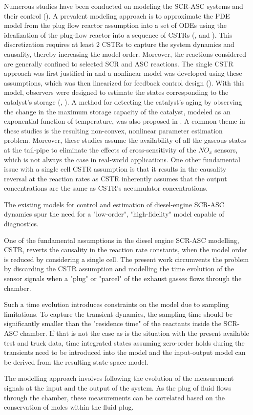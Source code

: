 Numerous studies have been conducted on modeling the SCR-ASC systems and their control (\cite{yuan2015diesel}). A
prevalent modeling approach is to approximate the PDE model from the plug flow reactor assumption into a set of ODEs
using the idealization of the plug-flow reactor into a sequence of CSTRs (\cite{hsieh2011development}, and
\cite{nova2014urea}). This discretization requires at least 2 CSTRs to capture the system dynamics and causality,
thereby increasing the model order. Moreover, the reactions considered are generally confined to selected SCR and ASC
reactions. The single CSTR approach was first justified in \cite{devarakonda2008adequacy} and a nonlinear model was
developed using these assumptions, which was then linearized for feedback control design (\cite{devarakonda2009model}).
With this model, observers were designed to estimate the states corresponding to the catalyst's storage
(\cite{ma2017observer}, \cite{jain2020term}). A method for detecting the catalyst's aging by observing the change in the
maximum storage capacity of the catalyst, modeled as an exponential function of temperature, was also proposed in
\cite{ma2017observer}. A common theme in these studies is the resulting non-convex, nonlinear parameter estimation
problem. Moreover, these studies assume the availability of all the gaseous states at the tail-pipe to eliminate the
effects of cross-sensitivity of the $NO_x$ sensors, which is not always the case in real-world applications. One other
fundamental issue with a single cell CSTR assumption is that it results in the causality reversal at the reaction rates
as CSTR inherently assumes that the output concentrations are the same as CSTR's accumulator concentrations.


The existing models for control and estimation of diesel-engine SCR-ASC dynamics spur the need for a "low-order",
"high-fidelity" model capable of diagnostics.

One of the fundamental assumptions in the diesel engine SCR-ASC modelling, CSTR, reverts the causality in the reaction
rate constants, when the model order is reduced by considering a single cell. The present work circumvents the problem
by discarding the CSTR assumption and modelling the time evolution of the sensor signals when a "plug" or "parcel" of
the exhaust gasses flows through the chamber.

Such a time evolution introduces constraints on the model due to sampling limitations. To capture the transient
dynamics, the sampling time should be significantly smaller than the "residence time" of the reactants inside the
SCR-ASC chamber. If that is not the case as is the situation with the present available test and truck data, time integrated states assuming zero-order holds during the transients need to be introduced into the model and the input-output model can be derived from the resulting state-space model.

The modelling approach involves following the evolution of the measurement signals at the input and the output of the
system. As the plug of fluid flows through the chamber, these measurements can be correlated based on the conservation
of moles within the fluid plug.
